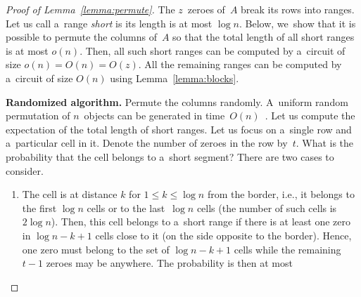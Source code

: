 \begin{proof}[Proof of Lemma~\ref{lemma:permute}]
The $z$~zeroes of~$A$ break its rows into ranges.
Let us call a~range {\em short} is its length is at most $\log n$.
Below, we~show that it is possible to permute the columns of~$A$
so that the total length of all short ranges is at most $o(n)$.
Then, all such short ranges can be computed by a~circuit of size
$o(n)=O(n)=O(z)$. All the remaining ranges can be
computed by a~circuit of size $O(n)$ using Lemma~\ref{lemma:blocks}.


\textbf{Randomized algorithm.}
Permute the columns randomly. A~uniform random permutation
of $n$~objects can be generated in
time~$O(n)$~\cite[Algorithm~P (Shuffling)]{DBLP:books/lib/Knuth98}.
Let us compute the expectation of
the total length of short ranges.
Let us focus on a~single row and a~particular cell in it. Denote the number of
zeroes in the row by~$t$. What is the probability that the cell belongs to
a~short segment? There are two cases to consider.


\begin{enumerate}
\item The cell is at distance $k$ for $1 \le k \le \log n$ from the border,
i.e., it belongs to the first $\log n$ cells or to the last~$\log n$ cells
(the number of such cells is $2\log n$). Then,
this cell belongs to a~short range if there is at least one zero
in $\log n - k + 1$ cells close to it (on the side opposite to the border).
Hence, one zero must belong to the set of $\log n - k + 1$ cells while the
remaining $t-1$ zeroes may be anywhere. The probability is then at most


\end{enumerate}
\end{proof}
